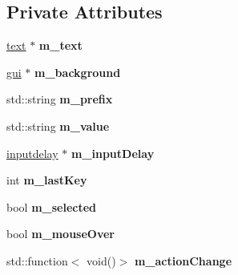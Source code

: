 \subsection*{Private Attributes}
\begin{DoxyCompactItemize}
\item 
\mbox{\label{classflounder_1_1inputtext_a4794f0a3d09dcc45a286f4eb3511ff3c}} 
\hyperlink{classflounder_1_1text}{text} $\ast$ {\bfseries m\+\_\+text}
\item 
\mbox{\label{classflounder_1_1inputtext_aa0fdb585208f6385de300a3c11336d0b}} 
\hyperlink{classflounder_1_1gui}{gui} $\ast$ {\bfseries m\+\_\+background}
\item 
\mbox{\label{classflounder_1_1inputtext_a4557935932e2527a470fafb6f8cdf178}} 
std\+::string {\bfseries m\+\_\+prefix}
\item 
\mbox{\label{classflounder_1_1inputtext_af88291b2fa2dfcb8f3dbace3f9dc4abd}} 
std\+::string {\bfseries m\+\_\+value}
\item 
\mbox{\label{classflounder_1_1inputtext_a1b03a7a75369059a684e0133adf8d7a0}} 
\hyperlink{classflounder_1_1inputdelay}{inputdelay} $\ast$ {\bfseries m\+\_\+input\+Delay}
\item 
\mbox{\label{classflounder_1_1inputtext_afd09ad8e2b567f08f86a18c3a8f3143e}} 
int {\bfseries m\+\_\+last\+Key}
\item 
\mbox{\label{classflounder_1_1inputtext_a6602ccd5d89133db62b79e113b83a44a}} 
bool {\bfseries m\+\_\+selected}
\item 
\mbox{\label{classflounder_1_1inputtext_a58ff602dc0d034d89ff0b598b52c262d}} 
bool {\bfseries m\+\_\+mouse\+Over}
\item 
\mbox{\label{classflounder_1_1inputtext_af52da18a4fc81af17c310a1db85b8b38}} 
std\+::function$<$ void()$>$ {\bfseries m\+\_\+action\+Change}
\end{DoxyCompactItemize}
